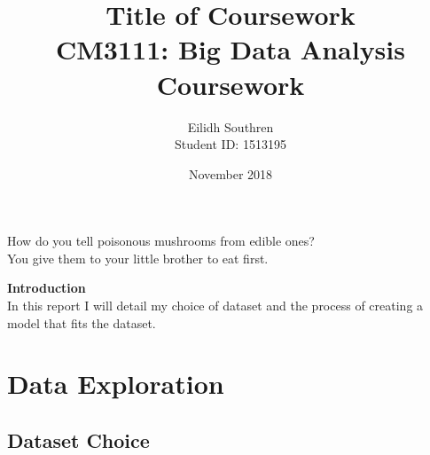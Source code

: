 \documentclass[10pt]{article}         %
\title{\Huge Title of Coursework \\[0.5in] \large CM3111: Big Data Analysis Coursework \\[2in]}  %
\author{Eilidh Southren \\[0.25in] Student ID: 1513195\\[3in]}          %
\date{November 2018}
\begin{document}




\maketitle              %
\pagebreak
{}
\vspace*{\fill}


\begin{center}{How do you tell poisonous mushrooms from edible ones?  \\[0.25in]You give them to your little brother to eat first.}\end{center}
\vspace*{\fill}
\pagebreak

\tableofcontents        %

\pagebreak

\textbf{Introduction\\}
In this report I will detail my choice of dataset and the process of creating a model that fits the dataset.
\section{Data Exploration}
\subsection{Dataset Choice}
\end{document}
